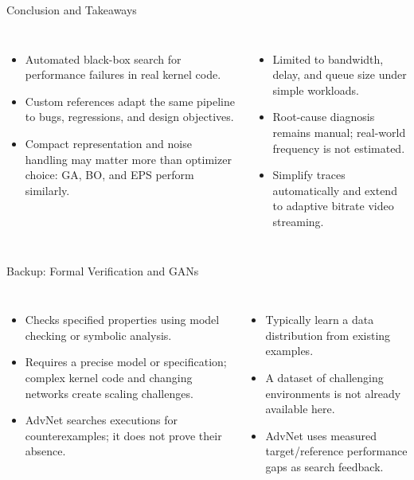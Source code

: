 \source{}
\begin{frame}[t]{Conclusion and Takeaways}
\begin{columns}[T,onlytextwidth]
\bodyfont
{}
\begin{itemize}
\bodyfont\setlength{\itemsep}{14pt}
\item Automated black-box search for performance failures in real kernel code.
\item Custom references adapt the same pipeline to bugs, regressions, and design objectives.
\item Compact representation and noise handling may matter more than optimizer choice: GA, BO, and EPS perform similarly.
\end{itemize}
\pause
{}
\bodyfont
{}
\begin{itemize}
\bodyfont\setlength{\itemsep}{14pt}
\item Limited to bandwidth, delay, and queue size under simple workloads.
\item Root-cause diagnosis remains manual; real-world frequency is not estimated.
\item Simplify traces automatically and extend to adaptive bitrate video streaming.
\end{itemize}
\end{columns}
\end{frame}

\source{}
\begin{frame}[t]{Backup: Formal Verification and GANs}
\begin{columns}[T,onlytextwidth]
\compactfont
{}
\begin{itemize}
\compactfont\setlength{\itemsep}{16pt}
\item Checks specified properties using model checking or symbolic analysis.
\item Requires a precise model or specification; complex kernel code and changing networks create scaling challenges.
\item AdvNet searches executions for counterexamples; it does not prove their absence.
\end{itemize}
\compactfont
{}
\begin{itemize}
\compactfont\setlength{\itemsep}{16pt}
\item Typically learn a data distribution from existing examples.
\item A dataset of challenging environments is not already available here.
\item AdvNet uses measured target/reference performance gaps as search feedback.
\end{itemize}
\end{columns}
\end{frame}

